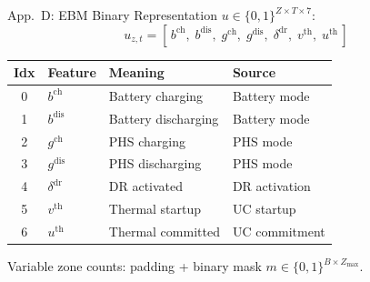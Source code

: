 \documentclass[aspectratio=169, 10pt]{beamer}
\newcommand{\backlink}[2]{\vfill\hfill\hyperlink{#1}{\beamerreturnbutton{\tiny #2}}}
\begin{document}
\begin{frame}{App.\ D: EBM Binary Representation}
\hypertarget{app:D}{}
$u \in \{0,1\}^{Z \times T \times 7}$:
\begin{equation*}
u_{z,t} = [\, b^{\mathrm{ch}},\; b^{\mathrm{dis}},\; g^{\mathrm{ch}},\; g^{\mathrm{dis}},\; \delta^{\mathrm{dr}},\; v^{\mathrm{th}},\; u^{\mathrm{th}} \,]
\end{equation*}
\centering
{\small
\begin{tabular}{clll}
\toprule
\textbf{Idx} & \textbf{Feature} & \textbf{Meaning} & \textbf{Source} \\
\midrule
0 & $b^{\mathrm{ch}}$ & Battery charging & Battery mode \\
1 & $b^{\mathrm{dis}}$ & Battery discharging & Battery mode \\
2 & $g^{\mathrm{ch}}$ & PHS charging & PHS mode \\
3 & $g^{\mathrm{dis}}$ & PHS discharging & PHS mode \\
4 & $\delta^{\mathrm{dr}}$ & DR activated & DR activation \\
5 & $v^{\mathrm{th}}$ & Thermal startup & UC startup \\
6 & $u^{\mathrm{th}}$ & Thermal committed & UC commitment \\
\bottomrule
\end{tabular}
}
\vspace{0.3em}

{\scriptsize Variable zone counts: padding + binary mask $m \in \{0,1\}^{B \times Z_{\max}}$.}
\backlink{main:ebm}{Block 4: EBM}
\end{frame}
\end{document}
